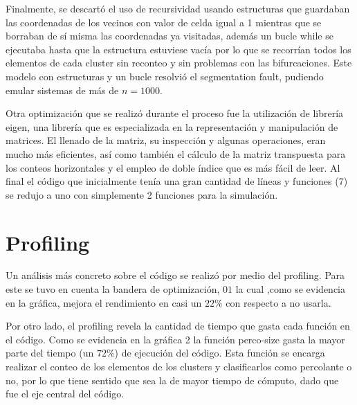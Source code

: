 \documentclass{article}
\begin{document}
\begin{multicols}{2}
Finalmente, se descartó el uso de recursividad usando estructuras que guardaban las coordenadas de los vecinos con valor de celda igual a 1 mientras que se borraban de sí misma las coordenadas ya visitadas, además un bucle while se ejecutaba hasta que la estructura estuviese vacía por lo que se recorrían todos los elementos de cada cluster sin reconteo y sin problemas con las bifurcaciones. Este modelo con estructuras y un bucle resolvió el segmentation fault, pudiendo emular sistemas de más de $n=1000$.

Otra optimización que se realizó durante el proceso fue la utilización de librería eigen, una librería que es especializada en la representación y manipulación de matrices. El llenado de la matriz, su inspección y algunas operaciones, eran mucho más eficientes, así como también el cálculo de la matriz transpuesta para los conteos horizontales y el empleo de doble índice que es más fácil de leer.  Al final el código que inicialmente tenía una gran cantidad de líneas y funciones (7) se redujo a uno con simplemente 2 funciones para la simulación.	  

\section{Profiling}

Un análisis más concreto sobre el código se realizó por medio del profiling. Para este se tuvo en cuenta la bandera de optimización, $01$ la cual ,como se evidencia en la gráfica, mejora el rendimiento en casi un $22\%$ con respecto a no usarla.

Por otro lado, el profiling revela la cantidad de tiempo que gasta cada función en el código. Como se evidencia en la gráfica 2 la función perco-size gasta la mayor parte del tiempo (un $72\%$) de ejecución del código. Esta función se encarga realizar el conteo de los elementos de los clusters y clasificarlos como percolante o no, por lo que tiene sentido que sea la de mayor tiempo de cómputo, dado que fue el eje central del código.


\end{multicols}
\end{document}
